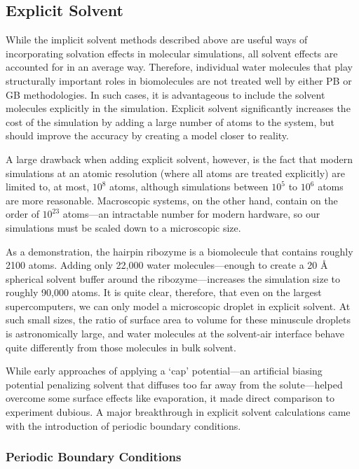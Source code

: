 \subsection{Explicit Solvent}

While the implicit solvent methods described above are useful ways of
incorporating solvation effects in molecular simulations, all solvent effects
are accounted for in an average way. Therefore, individual water molecules that
play structurally important roles in biomolecules are not treated well by either
PB or GB methodologies. In such cases, it is advantageous to include the solvent
molecules explicitly in the simulation. Explicit solvent significantly increases
the cost of the simulation by adding a large number of atoms to the system, but
should improve the accuracy by creating a model closer to reality.

A large drawback when adding explicit solvent, however, is the fact that modern
simulations at an atomic resolution (\ie where all atoms are treated explicitly)
are limited to, at most, $10^8$ atoms, \cite{100M_Stupid} although simulations
between $10^5$ to $10^6$ atoms are more reasonable. Macroscopic systems, on the
other hand, contain on the order of $10^{23}$ atoms---an intractable number for
modern hardware, so our simulations must be scaled down to a microscopic size.

As a demonstration, the hairpin ribozyme is a biomolecule that contains roughly
2100 atoms. Adding only 22,000 water molecules---enough to create a 20 {\AA}
spherical solvent buffer around the ribozyme---increases the simulation size to
roughly 90,000 atoms. It is quite clear, therefore, that even on the largest
supercomputers, we can only model a microscopic droplet in explicit solvent. At
such small sizes, the ratio of surface area to volume for these minuscule
droplets is astronomically large, and water molecules at the solvent-air
interface behave quite differently from those molecules in bulk solvent.

While early approaches of applying a `cap' potential---an artificial biasing
potential penalizing solvent that diffuses too far away from the solute---helped
overcome some surface effects like evaporation, it made direct comparison to
experiment dubious. A major breakthrough in explicit solvent calculations came
with the introduction of periodic boundary conditions. \cite{Allen_Tildesley}

\subsubsection{Periodic Boundary Conditions}

